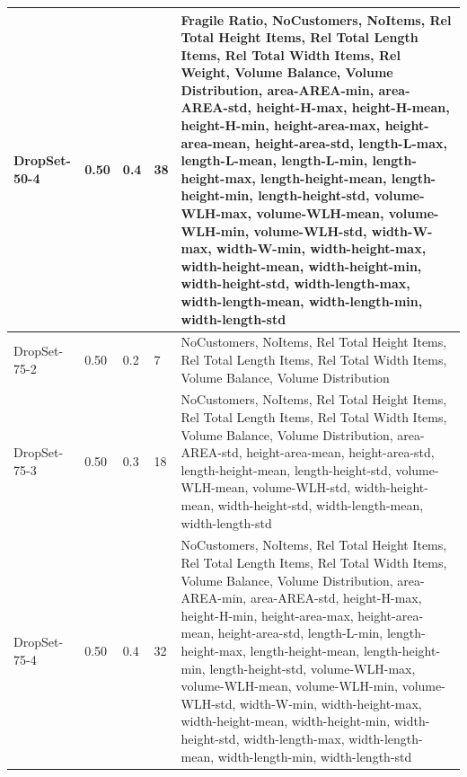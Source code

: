 \begin{table}[ht]
{\begin{tabular}{@{}P{0.045\paperheight}P{0.04\paperheight}P{0.07\paperheight}P{0.05\paperheight}P{0.47\paperheight}@{}}
			\midrule
			DropSet-50-4 & 0.50        & 0.4                             & 38              & Fragile Ratio, NoCustomers, NoItems, Rel Total Height Items, Rel Total Length Items, Rel Total Width Items, Rel Weight, Volume Balance, Volume Distribution, area-AREA-min, area-AREA-std, height-H-max, height-H-mean, height-H-min, height-area-max, height-area-mean, height-area-std, length-L-max, length-L-mean, length-L-min, length-height-max, length-height-mean, length-height-min, length-height-std, volume-WLH-max, volume-WLH-mean, volume-WLH-min, volume-WLH-std, width-W-max, width-W-min, width-height-max, width-height-mean, width-height-min, width-height-std, width-length-max, width-length-mean, width-length-min, width-length-std \\
			\midrule
			DropSet-75-2 & 0.50        & 0.2                             & 7               & NoCustomers, NoItems, Rel Total Height Items, Rel Total Length Items, Rel Total Width Items, Volume Balance, Volume Distribution                                                                                                                                                                                                                                                                                                                                                                                                                                                                                                                              \\
			\midrule
			DropSet-75-3 & 0.50        & 0.3                             & 18              & NoCustomers, NoItems, Rel Total Height Items, Rel Total Length Items, Rel Total Width Items, Volume Balance, Volume Distribution, area-AREA-std, height-area-mean, height-area-std, length-height-mean, length-height-std, volume-WLH-mean, volume-WLH-std, width-height-mean, width-height-std, width-length-mean, width-length-std                                                                                                                                                                                                                                                                                                                          \\
			\midrule
			DropSet-75-4 & 0.50        & 0.4                             & 32              & NoCustomers, NoItems, Rel Total Height Items, Rel Total Length Items, Rel Total Width Items, Volume Balance, Volume Distribution, area-AREA-min, area-AREA-std, height-H-max, height-H-min, height-area-max, height-area-mean, height-area-std, length-L-min, length-height-max, length-height-mean, length-height-min, length-height-std, volume-WLH-max, volume-WLH-mean, volume-WLH-min, volume-WLH-std, width-W-min, width-height-max, width-height-mean, width-height-min, width-height-std, width-length-max, width-length-mean, width-length-min, width-length-std                                                                                     \\


\end{tabular}}
\end{table}
